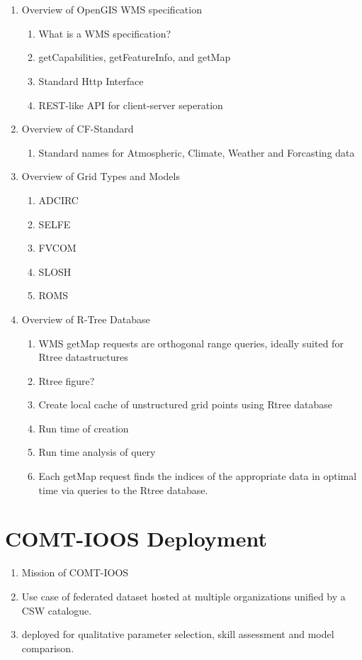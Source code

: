 \documentclass{article}
\begin{document}
\section{\sciwms{}}
\begin{enumerate}
  \item Overview of OpenGIS WMS specification
    \begin{enumerate}[label*=\arabic*.]
      \item What is a WMS specification?
      \item getCapabilities, getFeatureInfo, and getMap
      \item Standard Http Interface
      \item REST-like API for client-server seperation
    \end{enumerate}
  \item Overview of CF-Standard
    \begin{enumerate}[label*=\arabic*.]
      \item Standard names for Atmospheric, Climate, Weather and Forcasting data
    \end{enumerate}

  \item Overview of Grid Types and Models
    \begin{enumerate}[label*=\arabic*.]
      \item ADCIRC      
      \item SELFE
      \item FVCOM
      \item SLOSH
      \item ROMS
    \end{enumerate}

  \item Overview of R-Tree Database
    \begin{enumerate}
      \item WMS getMap requests are orthogonal range queries, ideally suited for Rtree datastructures
      \item Rtree figure?
      \item Create local cache of unstructured grid points using Rtree database
      \item Run time of creation
      \item Run time analysis of query
      \item Each getMap request finds the indices of the appropriate data in optimal time
        via queries to the Rtree database.
    \end{enumerate}
\end{enumerate}

\section{COMT-IOOS Deployment}
\begin{enumerate}
  \item Mission of COMT-IOOS
  \item Use case of federated dataset hosted at multiple organizations unified by a CSW catalogue.
  \item \sciwms{} deployed for qualitative parameter selection, skill assessment and model comparison.
\end{enumerate}
\end{document}
